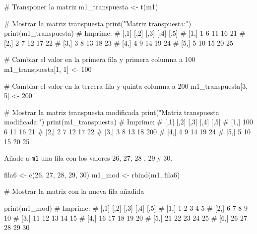 \documentclass[
  letterpaper,
  DIV=11,
  numbers=noendperiod]{scrreprt}
\newenvironment{Shaded}{\begin{snugshade}}{\end{snugshade}}
\newcommand{\CommentTok}[1]{\textcolor[rgb]{0.37,0.37,0.37}{#1}}
\newcommand{\DecValTok}[1]{\textcolor[rgb]{0.68,0.00,0.00}{#1}}
\newcommand{\FunctionTok}[1]{\textcolor[rgb]{0.28,0.35,0.67}{#1}}
\newcommand{\NormalTok}[1]{\textcolor[rgb]{0.00,0.23,0.31}{#1}}
\newcommand{\OtherTok}[1]{\textcolor[rgb]{0.00,0.23,0.31}{#1}}
\newcommand{\StringTok}[1]{\textcolor[rgb]{0.13,0.47,0.30}{#1}}
\begin{document}
\begin{Shaded}
\begin{Highlighting}[]
\CommentTok{\# Transponer la matriz}
\NormalTok{m1\_transpuesta }\OtherTok{\textless{}{-}} \FunctionTok{t}\NormalTok{(m1)}

\CommentTok{\# Mostrar la matriz transpuesta}
\FunctionTok{print}\NormalTok{(}\StringTok{"Matriz transpuesta:"}\NormalTok{)}
\FunctionTok{print}\NormalTok{(m1\_transpuesta)}
\CommentTok{\# Imprime:}
\CommentTok{\#      [,1] [,2] [,3] [,4] [,5]}
\CommentTok{\# [1,]    1    6   11   16   21}
\CommentTok{\# [2,]    2    7   12   17   22}
\CommentTok{\# [3,]    3    8   13   18   23}
\CommentTok{\# [4,]    4    9   14   19   24}
\CommentTok{\# [5,]    5   10   15   20   25}

\CommentTok{\# Cambiar el valor en la primera fila y primera columna a 100}
\NormalTok{m1\_transpuesta[}\DecValTok{1}\NormalTok{, }\DecValTok{1}\NormalTok{] }\OtherTok{\textless{}{-}} \DecValTok{100}

\CommentTok{\# Cambiar el valor en la tercera fila y quinta columna a 200}
\NormalTok{m1\_transpuesta[}\DecValTok{3}\NormalTok{, }\DecValTok{5}\NormalTok{] }\OtherTok{\textless{}{-}} \DecValTok{200}

\CommentTok{\# Mostrar la matriz transpuesta modificada}
\FunctionTok{print}\NormalTok{(}\StringTok{"Matriz transpuesta modificada:"}\NormalTok{)}
\FunctionTok{print}\NormalTok{(m1\_transpuesta)}
\CommentTok{\# Imprime:}
\CommentTok{\#      [,1] [,2] [,3] [,4] [,5]}
\CommentTok{\# [1,]  100    6   11   16   21}
\CommentTok{\# [2,]    2    7   12   17   22}
\CommentTok{\# [3,]    3    8   13   18  200}
\CommentTok{\# [4,]    4    9   14   19   24}
\CommentTok{\# [5,]    5   10   15   20   25}
\end{Highlighting}
\end{Shaded}

Añade a \texttt{m1} una fila con los valores 26, 27, 28 , 29 y 30.

\begin{Shaded}
\begin{Highlighting}[]
\NormalTok{fila6 }\OtherTok{\textless{}{-}} \FunctionTok{c}\NormalTok{(}\DecValTok{26}\NormalTok{, }\DecValTok{27}\NormalTok{, }\DecValTok{28}\NormalTok{, }\DecValTok{29}\NormalTok{, }\DecValTok{30}\NormalTok{)}
\NormalTok{m1\_mod }\OtherTok{\textless{}{-}} \FunctionTok{rbind}\NormalTok{(m1, fila6)}

\CommentTok{\# Mostrar la matriz con la nueva fila añadida}

\FunctionTok{print}\NormalTok{(m1\_mod)}
\CommentTok{\# Imprime:}
\CommentTok{\#      [,1] [,2] [,3] [,4] [,5]}
\CommentTok{\# [1,]    1    2    3    4    5}
\CommentTok{\# [2,]    6    7    8    9   10}
\CommentTok{\# [3,]   11   12   13   14   15}
\CommentTok{\# [4,]   16   17   18   19   20}
\CommentTok{\# [5,]   21   22   23   24   25}
\CommentTok{\# [6,]   26   27   28   29   30}
\end{Highlighting}
\end{Shaded}
\end{document}
